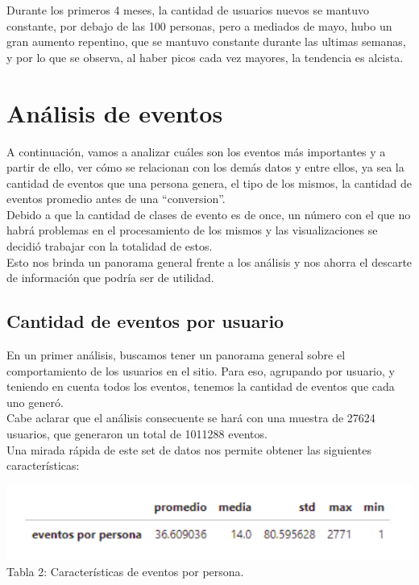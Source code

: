 \documentclass[a4paper ,12pt]{article}
\begin{document}
Durante los primeros 4 meses, la cantidad de usuarios nuevos se mantuvo constante, por debajo de las 100 personas, pero a mediados de mayo, hubo un gran aumento repentino, que se mantuvo constante durante las ultimas semanas, y por lo que se observa, al haber picos cada vez mayores, la tendencia es alcista.



\newpage

\section{Análisis de eventos}

A continuación, vamos a analizar cuáles son los eventos más importantes y a partir de ello, ver cómo se relacionan con los demás datos y entre ellos, ya sea la cantidad de eventos que una persona genera, el tipo de los mismos, la cantidad de eventos promedio antes de una “conversion”.\\


Debido a que la cantidad de clases de evento es de once, un número con el que no habrá problemas en el procesamiento de los mismos y las visualizaciones se decidió trabajar con la totalidad de estos.\\


Esto nos brinda un panorama general frente a los análisis y nos ahorra el descarte de información que podría ser de utilidad. 


\subsection{Cantidad de eventos por usuario}

En un primer análisis, buscamos tener un panorama general sobre el comportamiento de los usuarios en el sitio. Para eso, agrupando por usuario, y teniendo en cuenta todos los eventos, tenemos la cantidad de eventos que cada uno generó.\\


Cabe aclarar que el análisis consecuente se hará con una muestra de 27624 usuarios, que generaron un total de 1011288 eventos.\\


Una mirada rápida de este set de datos nos permite obtener las siguientes características:


\begin{center}
	\includegraphics[width=0.8\linewidth]{table_2}\\
	Tabla 2: Características de eventos por persona.
	
\end{center}
\end{document}
